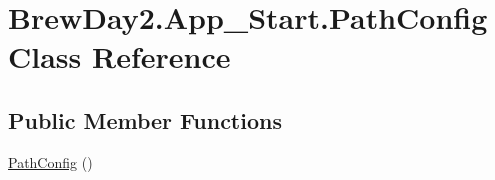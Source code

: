 \hypertarget{class_brew_day2_1_1_app___start_1_1_path_config}{}\section{Brew\+Day2.\+App\+\_\+\+Start.\+Path\+Config Class Reference}
\label{class_brew_day2_1_1_app___start_1_1_path_config}
\subsection*{Public Member Functions}
\begin{DoxyCompactItemize}
\item 
\mbox{\hyperlink{class_brew_day2_1_1_app___start_1_1_path_config_a56b793372986bb2b8413e7fe095b808e}{Path\+Config}} ()
\end{DoxyCompactItemize}
